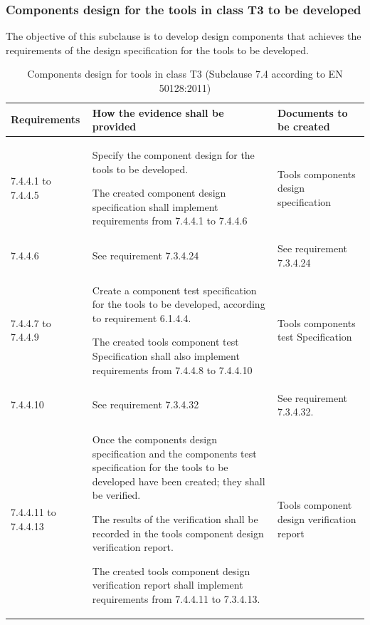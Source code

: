 \documentclass{template/openetcs_report}
\begin{document}
\subsubsection{Components design for the tools in class T3 to be developed}
\begin{flushleft}
The objective of this subclause is to develop design components that achieves the requirements of the design specification for the tools to be developed.
\end{flushleft}
{\footnotesize\sffamily\centering
\begin{longtable}{|p{2cm}|p{9cm}|p{3cm}|}
\caption{Components design for tools in class T3 (Subclause 7.4 according to EN 50128:2011)}\\
\hline
\bfseries Requirements & \bfseries How the evidence shall be provided & \bfseries Documents to be created\\
\hline
\hline
\endhead
\hline
\endfoot

7.4.4.1 to 7.4.4.5 & Specify the component design for the tools to be developed. 

The created component design specification shall implement requirements from 7.4.4.1 to 7.4.4.6
& Tools components design specification\\ 
\hline
7.4.4.6 & See requirement 7.3.4.24 & See requirement 7.3.4.24\\ 
\hline
7.4.4.7 to 7.4.4.9 & Create a component test specification for the tools to be developed, according to requirement 6.1.4.4.

The created tools component test Specification shall also implement requirements from 7.4.4.8 to 7.4.4.10
& Tools components test Specification\\ 
\hline
7.4.4.10 & See requirement 7.3.4.32 & See requirement 7.3.4.32.\\ 
\hline
7.4.4.11 to 7.4.4.13 & Once the components design specification and the components test specification for the tools to be developed have been created; they shall be verified.

The results of the verification shall be recorded in the tools component design verification report.

The created tools component design verification report shall implement requirements from 7.4.4.11 to 7.3.4.13.
& Tools component design verification report  \\ 
\hline
\end{longtable}}
\end{document}
